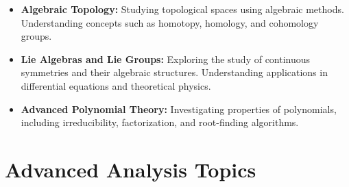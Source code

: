 \documentclass[openany]{book}
\begin{document}
\begin{itemize}
    \item \textbf{Algebraic Topology:} Studying topological spaces using algebraic methods. Understanding concepts such as homotopy, homology, and cohomology groups.
    \item \textbf{Lie Algebras and Lie Groups:} Exploring the study of continuous symmetries and their algebraic structures. Understanding applications in differential equations and theoretical physics.
    \item \textbf{Advanced Polynomial Theory:} Investigating properties of polynomials, including irreducibility, factorization, and root-finding algorithms.
\end{itemize}
\section{Advanced Analysis Topics}
\end{document}
